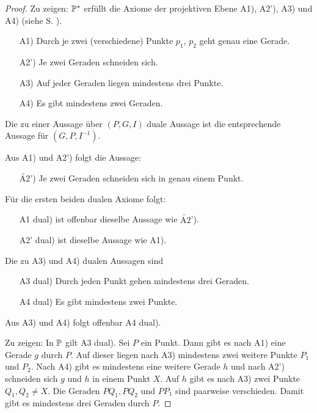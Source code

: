 \documentclass[
 a4paper,
 12pt,
 parskip=half
 ]{scrartcl}
\theoremstyle{plain}
\theoremstyle{definition}
\begin{document}
\begin{proof}
 Zu zeigen: $\mathbb{P}^*$ erfüllt die Axiome der projektiven Ebene A1), A2'), A3) und A4) (siehe S. \pageref{def:proj}).
 \begin{enumerate}[\hspace{.5cm}A2)]
  \item[A1)] Durch je zwei (verschiedene) Punkte $p_1$, $p_2$ geht genau eine Gerade.
  \item[A2')] Je zwei Geraden schneiden sich.
  \item[A3)] Auf jeder Geraden liegen mindestens drei Punkte.
  \item[A4)] Es gibt mindestens zwei Geraden.
 \end{enumerate}
 
 Die zu einer Aussage über $(P,G,I)$ duale Aussage ist die entsprechende Aussage für $(G,P,I^{-1})$\footnotemark.
 
 Aus A1) und A2') folgt die Aussage:
 \begin{enumerate}[\hspace{.5cm}A2)]
  \item [$\widetilde{\text{A2}}$')] Je zwei Geraden schneiden sich in genau einem Punkt.
 \end{enumerate}

 Für die ersten beiden dualen Axiome folgt:
 \begin{enumerate}
  \item[A1 dual)] ist offenbar dieselbe Aussage wie $\widetilde{\text{A2}}$').
  \item[A2' dual)] ist dieselbe Aussage wie A1).
 \end{enumerate}

 Die zu A3) und A4) dualen Aussagen sind
 \begin{enumerate}
  \item[A3 dual)] Durch jeden Punkt gehen mindestens drei Geraden.
  \item[A4 dual)] Es gibt mindestens zwei Punkte.
 \end{enumerate}
 Aus A3) und A4) folgt offenbar A4 dual). 
 
 Zu zeigen: In $\mathbb{P}$ gilt A3 dual). Sei $P$ ein Punkt. Dann gibt es nach A1) eine Gerade $g$ durch $P$.  Auf dieser liegen nach A3) mindestens zwei weitere Punkte $P_1$ und $P_2$. Nach A4) gibt es mindestens eine weitere Gerade $h$ und nach A2') schneiden sich $g$ und $h$ in einem Punkt $X$. Auf $h$ gibt es nach A3) zwei Punkte $Q_1, Q_2 \ne X$. Die Geraden $PQ_1, PQ_2$ und $PP_1$ sind paarweise verschieden. Damit gibt es mindestens drei Geraden durch $P$.
\end{proof}
\end{document}

